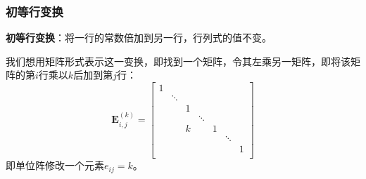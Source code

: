 \documentclass[9pt,dvipsnames]{beamer}
\begin{document}
\begin{frame}
	\frametitle{初等行变换}
	\textbf{初等行变换}：将一行的常数倍加到另一行，行列式的值不变。
	
	我们想用矩阵形式表示这一变换，即找到一个矩阵，令其左乘另一矩阵，即将该矩阵的第$i$行乘以$k$后加到第$j$行：\pause
	\[ \mathbf{E}_{i,j}^{(k)} = \left[\begin{matrix}
		1                                        \\
		  & \ddots                               \\
		  &        & 1                           \\
		  &        &   & \ddots                  \\
		  &        & k &        & 1              \\
		  &        &   &        &   & \ddots     \\
		  &        &   &        &   &        & 1 \\
	\end{matrix}\right] \]
	即单位阵修改一个元素$e_{ij}=k$。
\end{frame}
\end{document}
